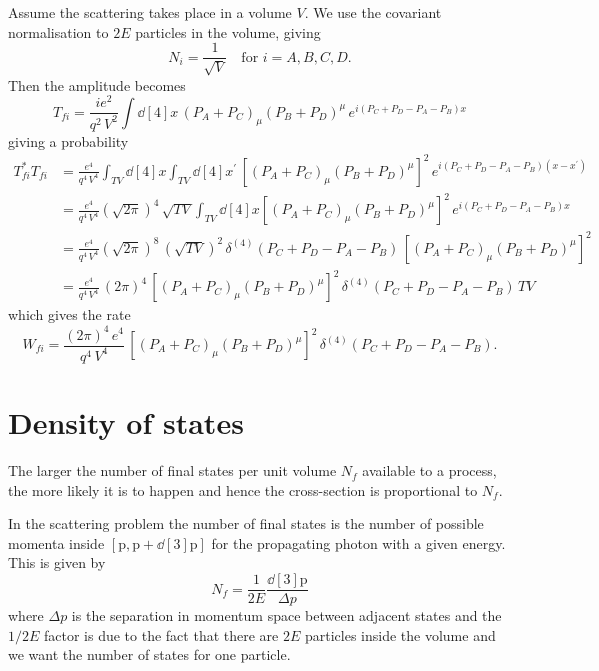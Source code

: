 \documentclass{report}
\renewcommand{\vec}[1]{\bm{\mathrm{#1}}}
\begin{document}
Assume the scattering takes place in a volume $V$. We use the covariant normalisation to $2E$ particles in the volume, giving
\begin{equation}
N_i = \frac{1}{\sqrt{V}} \quad \text{for $i=A,B,C,D$.}
\end{equation}
Then the amplitude becomes
\begin{equation}
T_{fi} = \frac{ie^2}{q^2 \, V^2} \int \dd[4]{x} \, (P_A + P_C)_\mu (P_B + P_D)^\mu \, e^{i(P_C+P_D-P_A-P_B)x}
\end{equation}
giving a probability
\begin{align}
T_{fi}^* T_{fi} &= \frac{e^4}{q^4 \, V^4} \int_{TV} \dd[4]x \int_{TV} \dd[4]x^\prime \, \left[ (P_A + P_C)_\mu (P_B + P_D)^\mu \right]^2 \, e^{i(P_C+P_D-P_A-P_B)(x-x^\prime)} \\
&= \frac{e^4}{q^4 \, V^4} \left(\sqrt{2\pi}\right)^4 \, \sqrt{TV} \int_{TV} \dd[4]{x} \left[ (P_A + P_C)_\mu (P_B + P_D)^\mu \right]^2 \, e^{i(P_C+P_D-P_A-P_B)x} \nonumber \\
&= \frac{e^4}{q^4 \, V^4} \left(\sqrt{2\pi}\right)^8 \, \left(\sqrt{TV}\right)^2 \, \delta^{(4)}(P_C+P_D-P_A-P_B) \,  \left[ (P_A + P_C)_\mu (P_B + P_D)^\mu \right]^2 \nonumber \\
&= \frac{e^4}{q^4 \, V^4} \, (2\pi)^4 \, \left[ (P_A + P_C)_\mu (P_B + P_D)^\mu \right]^2\, \delta^{(4)}(P_C+P_D-P_A-P_B)\, TV
\end{align}
which gives the rate
\begin{equation}
W_{fi} = \frac{(2\pi)^4\,e^4}{q^4 \, V^4} \, \left[ (P_A + P_C)_\mu (P_B + P_D)^\mu \right]^2\, \delta^{(4)}(P_C+P_D-P_A-P_B).
\end{equation}

\section{Density of states}
The larger the number of final states per unit volume $N_f$ available to a process, the more likely it is to happen and hence the cross-section is proportional to $N_f$.

In the scattering problem the number of final states is the number of possible momenta inside $[\vec{p}, \vec{p}+\dd[3]{\vec{p}}]$ for the propagating photon with a given energy. This is given by
\begin{equation}
N_f = \frac{1}{2E} \frac{\dd[3]{\vec{p}}}{\Delta p}
\end{equation}
where $\Delta p$ is the separation in momentum space between adjacent states and the $1/2E$ factor is due to the fact that there are $2E$ particles inside the volume and we want the number of states for one particle.
\end{document}
